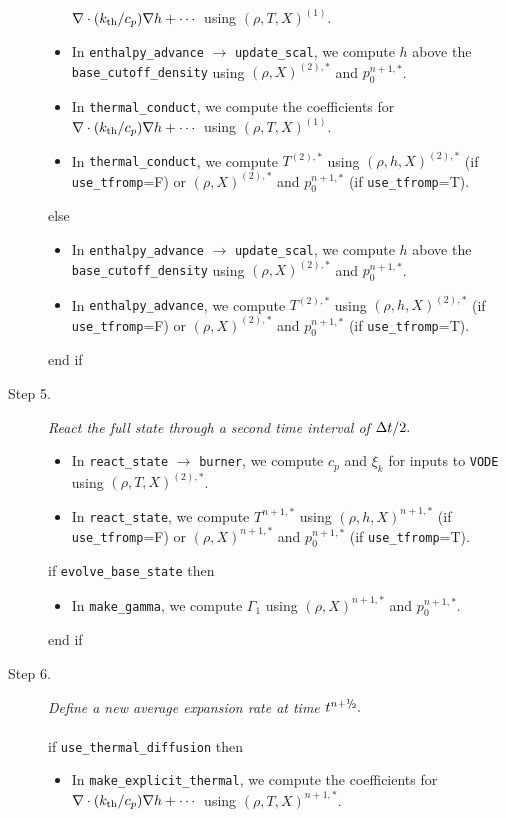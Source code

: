 \begin{description}
\begin{itemize}
$\nabla\cdot(k_{\rm th}/c_p)\nabla h + \cdots$ using $(\rho,T,X)^{(1)}$.
\item In {\tt enthalpy\_advance} $\rightarrow$ {\tt update\_scal}, we compute $h$ above
the {\tt base\_cutoff\_density} using $(\rho,X)^{(2),*}$ and $p_0^{n+1,*}$.
\item In {\tt thermal\_conduct}, we compute the coefficients for 
$\nabla\cdot(k_{\rm th}/c_p)\nabla h + \cdots$ using $(\rho,T,X)^{(1)}$.
\item In {\tt thermal\_conduct}, we compute $T^{(2),*}$ using $(\rho,h,X)^{(2),*}$
(if {\tt use\_tfromp}=F) or $(\rho,X)^{(2),*}$ and $p_0^{n+1,*}$ (if {\tt use\_tfromp}=T).
\end{itemize}
else
\begin{itemize}
\item In {\tt enthalpy\_advance} $\rightarrow$ {\tt update\_scal}, we compute $h$ above
the {\tt base\_cutoff\_density} using $(\rho,X)^{(2),*}$ and $p_0^{n+1,*}$.
\item In {\tt enthalpy\_advance}, we compute $T^{(2),*}$ using $(\rho,h,X)^{(2),*}$
(if {\tt use\_tfromp}=F) or $(\rho,X)^{(2),*}$ and $p_0^{n+1,*}$ (if {\tt use\_tfromp}=T).
\end{itemize}
end if
\item[Step 5.] {\em React the full state through a second time interval of $\Delta t/2.$}
\begin{itemize}
\item In {\tt react\_state} $\rightarrow$ {\tt burner}, we compute $c_p$ and $\xi_k$ 
for inputs to {\tt VODE} using $(\rho,T,X)^{(2),*}$.
\item In {\tt react\_state}, we compute $T^{n+1,*}$ using $(\rho,h,X)^{n+1,*}$ 
(if {\tt use\_tfromp}=F) or $(\rho,X)^{n+1,*}$ and $p_0^{n+1,*}$ (if {\tt use\_tfromp}=T).
\end{itemize}
if {\tt evolve\_base\_state} then
\begin{itemize}
\item In {\tt make\_gamma}, we compute $\Gamma_1$ using $(\rho,X)^{n+1,*}$ and $p_0^{n+1,*}$.
\end{itemize}
end if
\item[Step 6.] {\em Define a new average expansion rate at time $t^\nph.$}\\ \\
if {\tt use\_thermal\_diffusion} then
\begin{itemize}
\item In {\tt make\_explicit\_thermal}, we compute the coefficients for 
$\nabla\cdot(k_{\rm th}/c_p)\nabla h + \cdots$ using $(\rho,T,X)^{n+1,*}$.

\end{itemize}
\end{description}
